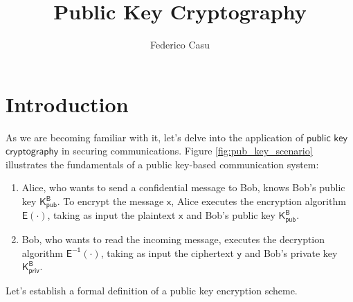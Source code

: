 \documentclass{article}
\title{Public Key Cryptography}
\author{Federico Casu}
\newcounter{definition}[section]
\begin{document}
\maketitle


\section{Introduction}
As we are becoming familiar with it, let's delve into the application of $\mathsf{public}$ $\mathsf{key}$ $\mathsf{cryptography}$ in securing communications. Figure \ref{fig:pub_key_scenario} illustrates the fundamentals of a public key-based communication system:

\begin{enumerate}
    \item Alice, who wants to send a confidential message to Bob, knows Bob's public key $\mathsf{K_{pub}^{B}}$. To encrypt the message $\mathsf{x}$, Alice executes the encryption algorithm $\mathsf{E(\cdot)}$, taking as input the plaintext $\mathsf{x}$ and Bob's public key $\mathsf{K_{pub}^{B}}$.
    \item Bob, who wants to read the incoming message, executes the decryption algorithm $\mathsf{E^{-1}(\cdot)}$, taking as input the ciphertext $\mathsf{y}$ and Bob's private key $\mathsf{K_{priv}^{B}}$.
\end{enumerate}

\par \noindent Let's establish a formal definition of a public key encryption scheme.
\end{document}
